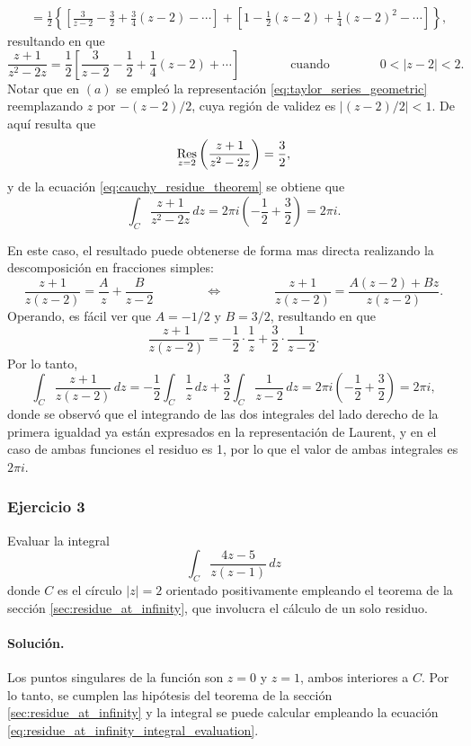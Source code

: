 \documentclass[a4paper]{report}
\def\Res{\qopname\relax m{Res}}
\begin{document}
\begin{enumerate}
\begin{align*}
   &=\frac{1}{2}\left\{\left[\frac{3}{z-2}-\frac{3}{2}+\frac{3}{4}(z-2)-\cdots\right]+\left[1-\frac{1}{2}(z-2)+\frac{1}{4}(z-2)^2-\cdots\right]\right\},
 \end{align*}
 resultando en que 
 \[
  \frac{z+1}{z^2-2z}=\frac{1}{2}\left[\frac{3}{z-2}-\frac{1}{2}+\frac{1}{4}(z-2)+\cdots\right]
  \qquad\qquad\textrm{cuando}\qquad\qquad
    0<|z-2|<2.
 \]
 Notar que en \((a)\) se empleó la representación \ref{eq:taylor_series_geometric} reemplazando \(z\) por \(-(z-2)/2\), cuya región de validez es \(|(z-2)/2|<1\). De aquí resulta que 
 \[
  \Res_{z=2}\left(\frac{z+1}{z^2-2z}\right)=\frac{3}{2},
 \]
 y de la ecuación \ref{eq:cauchy_residue_theorem} se obtiene que 
 \[
  \int_C\frac{z+1}{z^2-2z}\,dz=2\pi i\left(-\frac{1}{2}+\frac{3}{2}\right)=2\pi i.
 \]
 
 En este caso, el resultado puede obtenerse de forma mas directa realizando la descomposición en fracciones simples:
 \[
  \frac{z+1}{z(z-2)}=\frac{A}{z}+\frac{B}{z-2}
  \qquad\qquad\Leftrightarrow\qquad\qquad 
  \frac{z+1}{z(z-2)}=\frac{A(z-2)+Bz}{z(z-2)}.
 \]
 Operando, es fácil ver que \(A=-1/2\) y \(B=3/2\), resultando en que 
 \[
  \frac{z+1}{z(z-2)}=-\frac{1}{2}\cdot\frac{1}{z}+\frac{3}{2}\cdot\frac{1}{z-2}.
 \]
 Por lo tanto,
 \[
  \int_C\frac{z+1}{z(z-2)}\,dz=-\frac{1}{2}\int_C\frac{1}{z}\,dz+\frac{3}{2}\int_C\frac{1}{z-2}\,dz
   =2\pi i\left(-\frac{1}{2}+\frac{3}{2}\right)=2\pi i,
 \]
 donde se observó que el integrando de las dos integrales del lado derecho de la primera igualdad ya están expresados en la representación de Laurent, y en el caso de ambas funciones el residuo es 1, por lo que el valor de ambas integrales es \(2\pi i\).
\end{enumerate}

\subsubsection*{Ejercicio 3}

Evaluar la integral
\[
 \int_C\frac{4z-5}{z(z-1)}\,dz
\]
donde \(C\) es el círculo \(|z|=2\) orientado positivamente empleando el teorema de la sección \ref{sec:residue_at_infinity}, que involucra el cálculo de un solo residuo.

\paragraph{Solución.} Los puntos singulares de la función son \(z=0\) y \(z=1\), ambos interiores a \(C\). Por lo tanto, se cumplen las hipótesis del teorema de la sección \ref{sec:residue_at_infinity} y la integral se puede calcular empleando la ecuación \ref{eq:residue_at_infinity_integral_evaluation}.
\end{document}
